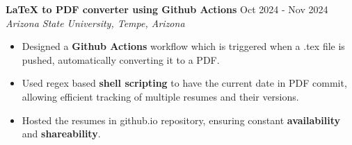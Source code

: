 \documentclass[a4paper,9pt]{extarticle}
\begin{document}
\noindent
\textbf{LaTeX to PDF converter using Github Actions} \hfill Oct 2024 - Nov 2024\\%
\textit{Arizona State University, Tempe, Arizona}
\begin{itemize}
    \item Designed a \textbf{Github Actions} workflow which is triggered when a .tex file is pushed, automatically converting it to a PDF.
    \item Used regex based \textbf{shell scripting} to have the current date in PDF commit, allowing efficient tracking of multiple resumes and their versions.
    \item Hosted the resumes in github.io repository, ensuring constant \textbf{availability} and \textbf{shareability}.
\end{itemize}

\end{document}
